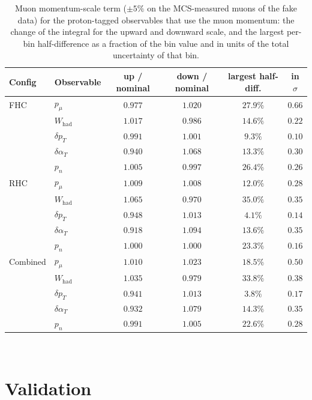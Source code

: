 \documentclass[11pt,a4paper]{article}
\begin{document}
\begin{table}[H]
  \centering
  \caption{Muon momentum-scale term ($\pm5\%$ on the MCS-measured muons of the fake data) for the
    proton-tagged observables that use the muon momentum: the change of the integral for the upward
    and downward scale, and the largest per-bin half-difference as a fraction of the bin value and in
    units of the total uncertainty of that bin.}
  \label{tab:pt_mcs}
  \small
  \begin{tabular}{llcccc}
    \toprule
    Config & Observable & up / nominal & down / nominal & largest half-diff. & in $\sigma$ \\
    \midrule
    FHC & $p_\mu$ & $0.977$ & $1.020$ & $27.9\%$ & $0.66$ \\
        & $W_\mathrm{had}$ & $1.017$ & $0.986$ & $14.6\%$ & $0.22$ \\
        & $\delta p_T$ & $0.991$ & $1.001$ & $9.3\%$ & $0.10$ \\
        & $\delta\alpha_T$ & $0.940$ & $1.068$ & $13.3\%$ & $0.30$ \\
        & $p_n$ & $1.005$ & $0.997$ & $26.4\%$ & $0.26$ \\
    \midrule
    RHC & $p_\mu$ & $1.009$ & $1.008$ & $12.0\%$ & $0.28$ \\
        & $W_\mathrm{had}$ & $1.065$ & $0.970$ & $35.0\%$ & $0.35$ \\
        & $\delta p_T$ & $0.948$ & $1.013$ & $4.1\%$ & $0.14$ \\
        & $\delta\alpha_T$ & $0.918$ & $1.094$ & $13.6\%$ & $0.35$ \\
        & $p_n$ & $1.000$ & $1.000$ & $23.3\%$ & $0.16$ \\
    \midrule
    Combined & $p_\mu$ & $1.010$ & $1.023$ & $18.5\%$ & $0.50$ \\
        & $W_\mathrm{had}$ & $1.035$ & $0.979$ & $33.8\%$ & $0.38$ \\
        & $\delta p_T$ & $0.941$ & $1.013$ & $3.8\%$ & $0.17$ \\
        & $\delta\alpha_T$ & $0.932$ & $1.079$ & $14.3\%$ & $0.35$ \\
        & $p_n$ & $0.991$ & $1.005$ & $22.6\%$ & $0.28$ \\
    \bottomrule
  \end{tabular}
\end{table}

\
\section{Validation}
\label{sec:pt_validation}
\end{document}
